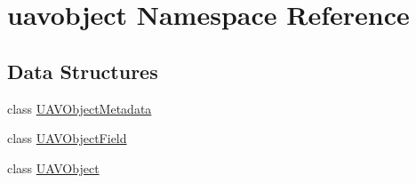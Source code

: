 \hypertarget{namespaceuavobject}{\section{uavobject Namespace Reference}
\label{namespaceuavobject}
}
\subsection*{Data Structures}
\begin{DoxyCompactItemize}
\item 
class \hyperlink{classuavobject_1_1_u_a_v_object_metadata}{U\-A\-V\-Object\-Metadata}
\item 
class \hyperlink{classuavobject_1_1_u_a_v_object_field}{U\-A\-V\-Object\-Field}
\item 
class \hyperlink{classuavobject_1_1_u_a_v_object}{U\-A\-V\-Object}
\end{DoxyCompactItemize}
